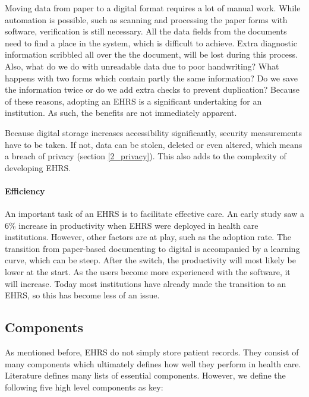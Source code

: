     Moving data from paper to a digital format requires a lot of manual work. While automation is possible, such as scanning and processing the paper forms with software, verification is still necessary. All the data fields from the documents need to find a place in the system, which is difficult to achieve. Extra diagnostic information scribbled all over the the document, will be lost during this process. Also, what do we do with unreadable data due to poor handwriting? What happens with two forms which contain partly the same information? Do we save the information twice or do we add extra checks to prevent duplication? Because of these reasons, adopting an EHRS is a significant undertaking for an institution. As such, the benefits are not immediately apparent.

    Because digital storage increases accessibility significantly, security measurements have to be taken. If not, data can be stolen, deleted or even altered, which means a breach of privacy (section \ref{2_privacy}). This also adds to the complexity of developing EHRS\@. %

    \paragraph{Efficiency} An important task of an EHRS is to facilitate effective care. An early study saw a 6\% increase in productivity when EHRS were deployed in health care institutions\cite{ehrs_efficiency}. However, other factors are at play, such as the adoption rate. The transition from paper-based documenting to digital is accompanied by a learning curve, which can be steep. After the switch, the productivity will most likely be lower at the start. As the users become more experienced with the software, it will increase. Today most institutions have already made the transition to an EHRS, so this has become less of an issue.

    \subsection{Components}\label{ehrs_components}

    As mentioned before, EHRS do not simply store patient records. They consist of many components which ultimately defines how well they perform in health care. Literature defines many lists of essential components. However, we define the following five high level components as key\cite{biomedical_informatics}:

